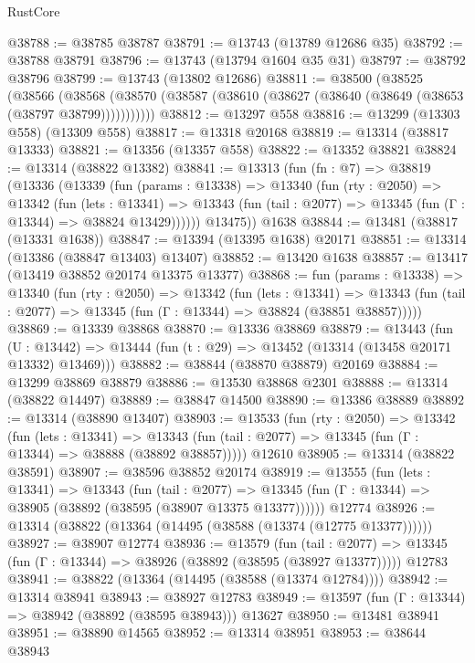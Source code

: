 \begin{lexlean}{RustCore}
\begin{coremodule}
@38788 := @38785 @38787
@38791 := @13743 (@13789 @12686 @35)
@38792 := @38788 @38791
@38796 := @13743 (@13794 @1604 @35 @31)
@38797 := @38792 @38796
@38799 := @13743 (@13802 @12686)
@38811 := @38500
    (@38525
      (@38566
        (@38568 (@38570 (@38587 (@38610 (@38627 (@38640 (@38649 (@38653 (@38797 @38799)))))))))))
@38812 := @13297 @558
@38816 := @13299 (@13303 @558) (@13309 @558)
@38817 := @13318 @20168
@38819 := @13314 (@38817 @13333)
@38821 := @13356 (@13357 @558)
@38822 := @13352 @38821
@38824 := @13314 (@38822 @13382)
@38841 := @13313
    (fun (fn : @7) =>
    @38819
      (@13336
        (@13339
          (fun (params : @13338) =>
          @13340
            (fun (rty : @2050) =>
            @13342
              (fun (lets : @13341) =>
              @13343 (fun (tail : @2077) => @13345 (fun (Γ : @13344) => @38824 @13429))))))
        @13475))
    @1638
@38844 := @13481 (@38817 (@13331 @1638))
@38847 := @13394 (@13395 @1638) @20171
@38851 := @13314 (@13386 (@38847 @13403) @13407)
@38852 := @13420 @1638
@38857 := @13417 (@13419 @38852 @20174 @13375 @13377)
@38868 := fun (params : @13338) =>
  @13340
    (fun (rty : @2050) =>
    @13342
      (fun (lets : @13341) =>
      @13343 (fun (tail : @2077) => @13345 (fun (Γ : @13344) => @38824 (@38851 @38857)))))
@38869 := @13339 @38868
@38870 := @13336 @38869
@38879 := @13443
    (fun (U : @13442) => @13444 (fun (t : @29) => @13452 (@13314 (@13458 @20171 @13332) @13469)))
@38882 := @38844 (@38870 @38879) @20169
@38884 := @13299 @38869 @38879
@38886 := @13530 @38868 @2301
@38888 := @13314 (@38822 @14497)
@38889 := @38847 @14500
@38890 := @13386 @38889
@38892 := @13314 (@38890 @13407)
@38903 := @13533
    (fun (rty : @2050) =>
    @13342
      (fun (lets : @13341) =>
      @13343 (fun (tail : @2077) => @13345 (fun (Γ : @13344) => @38888 (@38892 @38857)))))
    @12610
@38905 := @13314 (@38822 @38591)
@38907 := @38596 @38852 @20174
@38919 := @13555
    (fun (lets : @13341) =>
    @13343
      (fun (tail : @2077) =>
      @13345 (fun (Γ : @13344) => @38905 (@38892 (@38595 (@38907 @13375 @13377))))))
    @12774
@38926 := @13314 (@38822 (@13364 (@14495 (@38588 (@13374 (@12775 @13377))))))
@38927 := @38907 @12774
@38936 := @13579
    (fun (tail : @2077) => @13345 (fun (Γ : @13344) => @38926 (@38892 (@38595 (@38927 @13377)))))
    @12783
@38941 := @38822 (@13364 (@14495 (@38588 (@13374 @12784))))
@38942 := @13314 @38941
@38943 := @38927 @12783
@38949 := @13597 (fun (Γ : @13344) => @38942 (@38892 (@38595 @38943))) @13627
@38950 := @13481 @38941
@38951 := @38890 @14565
@38952 := @13314 @38951
@38953 := @38644 @38943

\end{coremodule}
\end{lexlean}
